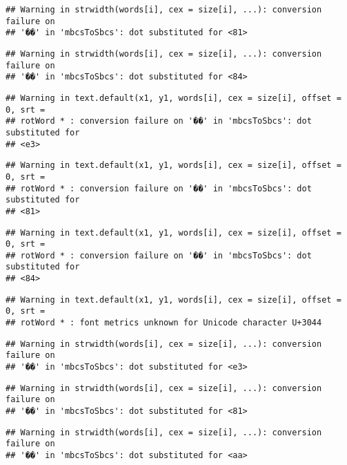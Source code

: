 \documentclass[]{article}
\begin{document}
\begin{verbatim}
## Warning in strwidth(words[i], cex = size[i], ...): conversion failure on
## '��' in 'mbcsToSbcs': dot substituted for <81>
\end{verbatim}

\begin{verbatim}
## Warning in strwidth(words[i], cex = size[i], ...): conversion failure on
## '��' in 'mbcsToSbcs': dot substituted for <84>
\end{verbatim}

\begin{verbatim}
## Warning in text.default(x1, y1, words[i], cex = size[i], offset = 0, srt =
## rotWord * : conversion failure on '��' in 'mbcsToSbcs': dot substituted for
## <e3>
\end{verbatim}

\begin{verbatim}
## Warning in text.default(x1, y1, words[i], cex = size[i], offset = 0, srt =
## rotWord * : conversion failure on '��' in 'mbcsToSbcs': dot substituted for
## <81>
\end{verbatim}

\begin{verbatim}
## Warning in text.default(x1, y1, words[i], cex = size[i], offset = 0, srt =
## rotWord * : conversion failure on '��' in 'mbcsToSbcs': dot substituted for
## <84>
\end{verbatim}

\begin{verbatim}
## Warning in text.default(x1, y1, words[i], cex = size[i], offset = 0, srt =
## rotWord * : font metrics unknown for Unicode character U+3044
\end{verbatim}

\begin{verbatim}
## Warning in strwidth(words[i], cex = size[i], ...): conversion failure on
## '��' in 'mbcsToSbcs': dot substituted for <e3>
\end{verbatim}

\begin{verbatim}
## Warning in strwidth(words[i], cex = size[i], ...): conversion failure on
## '��' in 'mbcsToSbcs': dot substituted for <81>
\end{verbatim}

\begin{verbatim}
## Warning in strwidth(words[i], cex = size[i], ...): conversion failure on
## '��' in 'mbcsToSbcs': dot substituted for <aa>
\end{verbatim}
\end{document}

